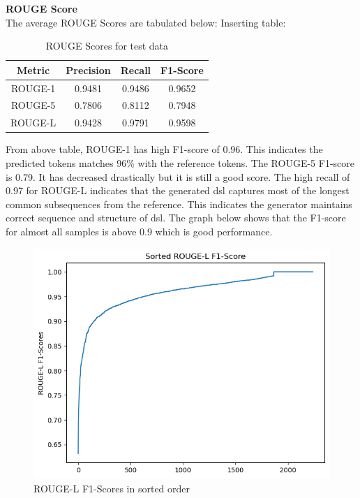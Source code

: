 \documentclass{ioereport}
\begin{document}
    
        
\textbf{ROUGE Score}\\
The average ROUGE Scores are tabulated below:
    Inserting table:
    \begin{table}[H]
        \caption{ROUGE Scores for test data}
        \label{tab:sample}
        \centering
        \begin{tabular}{|c|c|c|c|}
            \hline
            \textbf{Metric} & \textbf{Precision} & \textbf{Recall} &\textbf{F1-Score}\\
            \hline
            ROUGE-1 & 0.9481 & 0.9486 &0.9652 \\
            \hline
            ROUGE-5 & 0.7806&0.8112 & 0.7948 \\
            \hline
            ROUGE-L & 0.9428 & 0.9791 & 0.9598 \\
            \hline
        \end{tabular}
    \end{table}
    From above table, ROUGE-1 has high F1-score of 0.96. This indicates the predicted
tokens matches 96\% with the reference tokens. The ROUGE-5 F1-score is 0.79. It has
decreased drastically but it is still a good score. The high recall of 0.97 for ROUGE-L
indicates that the generated \gls{dsl} captures most of the longest common subsequences
from the reference. This indicates the generator maintains correct sequence and structure of \gls{dsl}. The graph below shows that the F1-score for almost all samples is
above 0.9 which is good performance.

 \begin{figure}[H]
        \includegraphics[scale=.8]{images/rouge-L F1-scores in sorted order.png}
        \caption{ROUGE-L F1-Scores in sorted order}
        \label{fig:rouge-l-F1 score}
    \end{figure}
\end{document}
